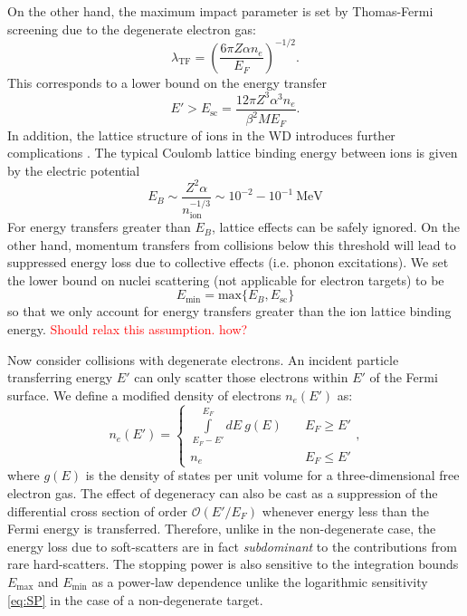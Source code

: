 \documentclass[twocolumn,showpacs,preprintnumbers,amsmath,amssymb,prd]{revtex4}
\def\r{\right)}
\def\l{\left(}
\begin{document}
\begin{appendices}
On the other hand, the maximum impact parameter is set by Thomas-Fermi screening due to the degenerate electron gas:
\begin{equation}
\label{eq:TF}
\lambda_{\text{TF}} = \l \frac{6 \pi Z \alpha n_e}{E_F}\r^{-1/2}.
\end{equation}
This corresponds to a lower bound on the energy transfer
\begin{equation}
E' > E_{\text{sc}} = \frac{12 \pi Z^3 \alpha ^3 n_e}{\beta^2 M E_F}.
\end{equation}
In addition, the lattice structure of ions in the WD introduces further complications \cite{Teukolsky}. The typical Coulomb lattice binding energy between ions is given by the electric potential
\begin{equation}
\label{eq:lattice}
E_B \sim \frac{Z^2 \alpha}{n_\text{ion}^{-1/3}} \sim 10^{-2} - 10^{-1} ~\text{MeV}
\end{equation}
For energy transfers greater than $E_B$, lattice effects can be safely ignored. On the other hand, momentum transfers from collisions below this threshold will lead to suppressed energy loss due to collective effects (i.e. phonon excitations). We set the lower bound on nuclei scattering (not applicable for electron targets) to be
\begin{equation}
E_{\text{min}} = \text{max} \{E_B,E_{\text{sc}}\}
\end{equation}
so that we only account for energy transfers greater than the ion lattice binding energy. \textcolor{red}{Should relax this assumption. how?}

Now consider collisions with degenerate electrons. An incident particle transferring energy $E'$ can only scatter those electrons within $E'$ of the Fermi surface. We define a modified density of electrons $n_e(E')$ as:
\begin{equation}
\label{pauli}
n_e(E') = \left\{
        \begin{array}{ll}
            \displaystyle \int \limits_{E_F -E'}^{E_F}dE ~g(E) & \quad E_F \geq E' \\
            n_e & \quad E_F \leq E'
        \end{array}
    \right.,
\end{equation}
where $g(E)$ is the density of states per unit volume for a three-dimensional free electron gas. The effect of degeneracy can also be cast as a suppression of the differential cross section of order $\mathcal{O}(E'/E_F)$ whenever energy less than the Fermi energy is transferred. Therefore, unlike in the non-degenerate case, the energy loss due to soft-scatters are in fact \emph{subdominant} to the contributions from rare hard-scatters. The stopping power is also sensitive to the integration bounds $E_{\text{max}}$ and $E_{\text{min}}$ as a power-law dependence unlike the logarithmic sensitivity \eqref{eq:SP} in the case of a non-degenerate target.


\end{appendices}
\end{document}
